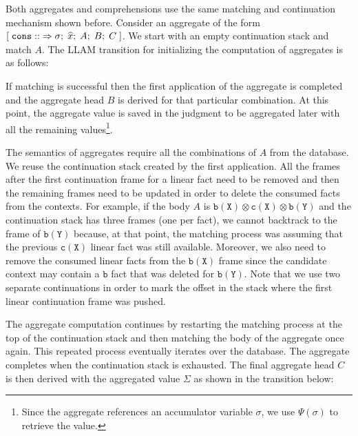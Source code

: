 Both aggregates and comprehensions use the same matching and continuation
mechanism shown before.  Consider an aggregate of the form
$[\; \mathtt{cons ::} \Rightarrow \sigma; \; \widehat{x}; \; A; \; B; \; C \;]$. We start with an
empty continuation stack and match $A$.  The LLAM transition for initializing
the computation of aggregates is as follows:



If matching is successful then the first application of the aggregate is
completed and the aggregate head $B$ is derived for that particular combination.
At this point, the aggregate value is saved in the judgment to be aggregated
later with all the remaining values\footnote{Since the aggregate references an
accumulator variable $\sigma$, we use $\Psi(\sigma)$ to retrieve the value.}.

The semantics of aggregates require all the combinations of $A$ from
the database. We reuse the continuation stack created by the first
application. All the frames after the first continuation frame for a linear fact
need to be removed and then the remaining frames need to be updated in order to
delete the consumed facts from the contexts. For example, if the body $A$ is
$\mathtt{b(X)} \otimes \mathtt{c(X)} \otimes \mathtt{b(Y)}$ and the continuation
stack has three frames (one per fact), we cannot backtrack to the frame of
$\mathtt{b(Y)}$ because, at that point, the matching process was assuming that
the previous $\mathtt{c(X)}$ linear fact was still available.  Moreover, we also
need to remove the consumed linear facts from the $\mathtt{b(X)}$ frame
since the candidate context may contain a $\mathtt{b}$ fact that was deleted
for $\mathtt{b(Y)}$. Note that we use two separate continuations in order to
mark the offset in the stack where the first linear continuation frame was
pushed.

The aggregate computation continues by restarting the matching process at the
top of the continuation stack and then matching the body of the aggregate once
again. This repeated process eventually iterates over the database. The
aggregate completes when the continuation stack is exhausted. The final
aggregate head $C$ is then derived with the aggregated value $\Sigma$ as shown
in the transition below:


